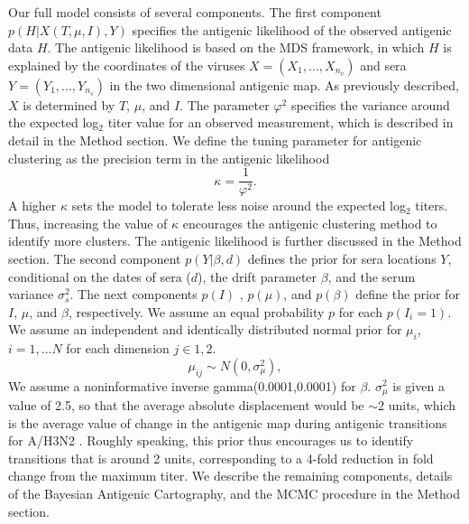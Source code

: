 \documentclass[11pt,oneside,letterpaper]{article}
\newcommand{\mdssd}{\varphi}						%
\begin{document}
Our full model consists of several components.
The first component $p(H|X(T, \mu, I),Y )$ specifies the antigenic likelihood of the observed antigenic data $H$.
The antigenic likelihood is based on the MDS framework, in which $H$ is explained by the coordinates of the viruses $X=(X_1, ..., X_{n_v} )$ and sera $Y = (Y_1, ..., Y_{n_{s}} )$  in the two dimensional antigenic map.
As previously described, $X$ is determined by $T$, $\mu$, and $I$.
The parameter $\mdssd^2$ specifies the variance around the expected log$_2$ titer value for an observed measurement, which is described in detail in the Method section.
We define the tuning parameter for antigenic clustering as the precision term in the antigenic likelihood
\begin{equation}
  \kappa = \frac{1}{\mdssd^2}.
\end{equation}
A higher $\kappa$ sets the model to tolerate less noise around the expected log$_2$ titers.
Thus, increasing the value of $\kappa$ encourages the antigenic clustering method to identify more clusters.
The antigenic likelihood is further discussed in the Method section.
The second component $p(Y|  \beta , d)$ defines the prior for sera locations $Y$, conditional on the dates of sera ($d$), the drift parameter $\beta$, and the serum variance $\sigma^2_s$. 
The next components $p(I)$ , $p(\mu)$, and $p(\beta)$ define the prior for $I$, $\mu$, and $\beta$, respectively.
We assume an equal probability $p$ for each $p(I_i = 1)$.
We assume an independent and identically distributed normal prior for $\mu_i$, $i=1,...N$ for each dimension $j \in {1,2}$.
\begin{equation}
   \mu_{ij}  \sim N( 0 , \sigma^2_\mu)			,
\end{equation}
We assume a noninformative inverse gamma(0.0001,0.0001) for $\beta$.
$\sigma^2_\mu$ is given a value of 2.5, so that the average absolute displacement would be $\sim$2 units, which is the average value of change in the antigenic map during antigenic transitions for A/H3N2 \cite{jong_antigenic_2007}.
Roughly speaking, this prior thus encourages us to identify transitions that is around 2 units, corresponding to a 4-fold reduction in fold change from the maximum titer.
We describe the remaining components, details of the Bayesian Antigenic Cartography, and the MCMC procedure in the Method section.



\newpage
\end{document}
